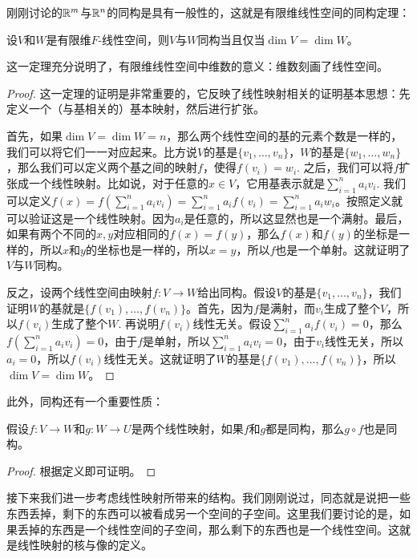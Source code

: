 刚刚讨论的$\mathbb{R}^m$与$\mathbb{R}^n$的同构是具有一般性的，这就是有限维线性空间的同构定理：

\begin{theorem}[有限维线性空间的同构定理]\label{thm:finite-dim-linear-space-isomorphism}
设$V$和$W$是有限维$F$-线性空间，则$V$与$W$同构当且仅当$\dim V=\dim W$。
\end{theorem}
这一定理充分说明了，有限维线性空间中维数的意义：维数刻画了线性空间。
\begin{proof}
    这一定理的证明是非常重要的，它反映了线性映射相关的证明基本思想：先定义一个（与基相关的）基本映射，然后进行扩张。
    
    首先，如果$\dim V=\dim W=n$，那么两个线性空间的基的元素个数是一样的，我们可以将它们一一对应起来。比方说$V$的基是$\{v_1,\dots,v_n\}$，$W$的基是$\{w_1,\dots,w_n\}$，那么我们可以定义两个基之间的映射$f$，使得$f(v_i)=w_i$. 之后，我们可以将$f$扩张成一个线性映射。比如说，对于任意的$x\in V$，它用基表示就是$\sum_{i=1}^n a_iv_i$. 我们可以定义$f(x)=f(\sum_{i=1}^n a_iv_i)=\sum_{i=1}^n a_if(v_i)=\sum_{i=1}^n a_iw_i$。按照定义就可以验证这是一个线性映射。因为$a_i$是任意的，所以这显然也是一个满射。最后，如果有两个不同的$x,y$对应相同的$f(x)=f(y)$，那么$f(x)$和$f(y)$的坐标是一样的，所以$x$和$y$的坐标也是一样的，所以$x=y$，所以$f$也是一个单射。这就证明了$V$与$W$同构。

    反之，设两个线性空间由映射$f:V\to W$给出同构。假设$V$的基是$\{v_1,\dots,v_n\}$，我们证明$W$的基就是$\{f(v_1),\dots,f(v_n)\}$。首先，因为$f$是满射，而$v_i$生成了整个$V$，所以$f(v_i)$生成了整个$W$. 再说明$f(v_i)$线性无关。假设$\sum_{i=1}^n a_if(v_i)=0$，那么$f(\sum_{i=1}^n a_iv_i)=0$，由于$f$是单射，所以$\sum_{i=1}^n a_iv_i=0$，由于$v_i$线性无关，所以$a_i=0$，所以$f(v_i)$线性无关。这就证明了$W$的基是$\{f(v_1),\dots,f(v_n)\}$，所以$\dim V=\dim W$。
\end{proof}

此外，同构还有一个重要性质：
\begin{proposition}\label{prop:isomorphism-composition}
假设$f:V\to W$和$g:W\to U$是两个线性映射，如果$f$和$g$都是同构，那么$g\circ f$也是同构。
\end{proposition}
\begin{proof}
    根据定义即可证明。    
\end{proof}



接下来我们进一步考虑线性映射所带来的结构。我们刚刚说过，同态就是说把一些东西丢掉，剩下的东西可以被看成另一个空间的子空间。这里我们要讨论的是，如果丢掉的东西是一个线性空间的子空间，那么剩下的东西也是一个线性空间。这就是线性映射的核与像的定义。

